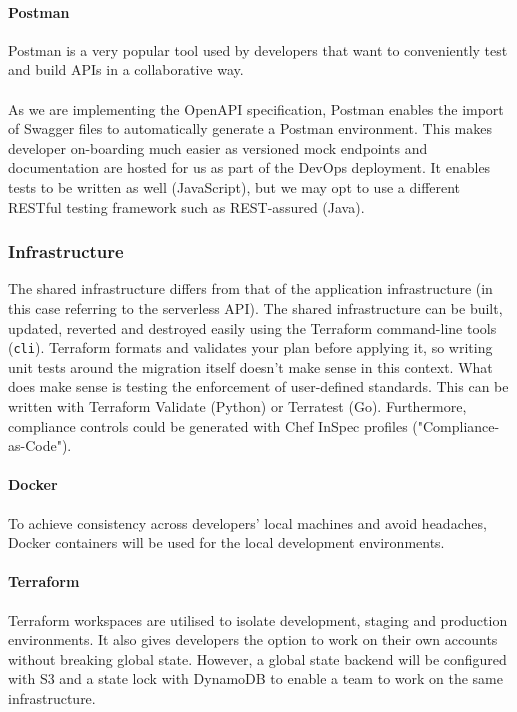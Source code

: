 \documentclass[10pt]{article}
\begin{document}
\paragraph{Postman}

Postman is a very popular tool used by developers that want to conveniently test and build APIs in a collaborative way.
\\ \\
As we are implementing the OpenAPI specification, Postman enables the import of Swagger files to automatically generate a Postman environment. This makes developer on-boarding much easier as versioned mock endpoints and documentation are hosted for us as part of the DevOps deployment. It enables tests to be written as well (JavaScript), but we may opt to use a different RESTful testing framework such as REST-assured (Java).

\subsubsection{Infrastructure}
The shared infrastructure differs from that of the application infrastructure (in this case referring to the serverless API). The shared infrastructure can be built, updated, reverted and destroyed easily using the Terraform command-line tools (\texttt{cli}). Terraform formats and validates your plan before applying it, so writing unit tests around the migration itself doesn't make sense in this context. What does make sense is testing the enforcement of user-defined standards. This can be written with Terraform Validate (Python) or Terratest (Go). Furthermore, compliance controls could be generated with Chef InSpec profiles ("Compliance-as-Code").

\paragraph{Docker}
To achieve consistency across developers' local machines and avoid headaches, Docker containers will be used for the local development environments.

\paragraph{Terraform}
Terraform workspaces are utilised to isolate development, staging and production environments. It also gives developers the option to work on their own accounts without breaking global state. However, a global state backend will be configured with S3 and a state lock with DynamoDB to enable a team to work on the same infrastructure.
\end{document}
